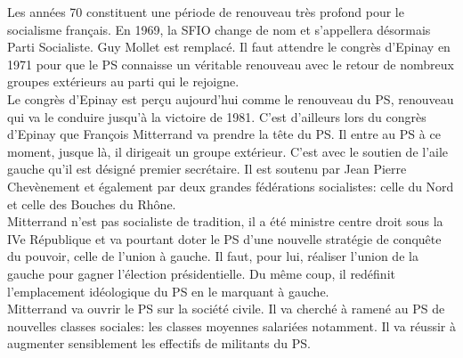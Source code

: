 \documentclass[10pt, a4paper, openany]{book}
\begin{document}
Les années 70 constituent une période de renouveau très profond pour le socialisme français. En 1969, la SFIO change de nom et s'appellera désormais Parti Socialiste. Guy Mollet est remplacé. Il faut attendre le congrès d'Epinay en 1971 pour que le PS connaisse un véritable renouveau avec le retour de nombreux groupes extérieurs au parti qui le rejoigne. \\
Le congrès d'Epinay est perçu aujourd'hui comme le renouveau du PS, renouveau qui va le conduire jusqu'à la victoire de 1981. C'est d'ailleurs lors du congrès d'Epinay que François Mitterrand va prendre la tête du PS. Il entre au PS à ce moment, jusque là, il dirigeait un groupe extérieur. C'est avec le soutien de l'aile gauche qu'il est désigné premier secrétaire. Il est soutenu par Jean Pierre Chevènement et également par deux grandes fédérations socialistes: celle du Nord et celle des Bouches du Rhône. \\
Mitterrand n'est pas socialiste de tradition, il a été ministre centre droit sous la IVe République et va pourtant doter le PS d'une nouvelle stratégie de conquête du pouvoir, celle de l'union à gauche. Il faut, pour lui, réaliser l'union de la gauche pour gagner l'élection présidentielle. Du même coup, il redéfinit l'emplacement idéologique du PS en le marquant à gauche. \\
Mitterrand va ouvrir le PS sur la société civile. Il va cherché à ramené au PS de nouvelles classes sociales: les classes moyennes salariées notamment. Il va réussir à augmenter sensiblement les effectifs de militants du PS. 
\end{document}
